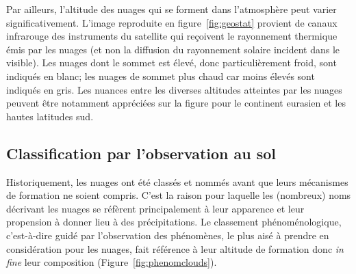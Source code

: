\sk
Par ailleurs, l'altitude des nuages qui se forment dans l'atmosphère peut varier significativement. L'image reproduite en figure~\ref{fig:geostat} provient de canaux infrarouge des instruments du satellite qui reçoivent le rayonnement thermique émis par les nuages (et non la diffusion du rayonnement solaire incident dans le visible). Les nuages dont le sommet est élevé, donc particulièrement froid, sont indiqués en blanc; les nuages de sommet plus chaud car moins élevés sont indiqués en gris. Les nuances entre les diverses altitudes atteintes par les nuages peuvent être notamment appréciées sur la figure pour le continent eurasien et les hautes latitudes sud.

\sk
\subsection{Classification par l'observation au sol}

\sk
Historiquement, les nuages ont été classés et nommés avant que leurs mécanismes de formation ne soient compris. C'est la raison pour laquelle les (nombreux) noms décrivant les nuages se réfèrent principalement à leur apparence et leur propension à donner lieu à des précipitations. Le classement phénoménologique, c'est-à-dire guidé par l'observation des phénomènes, le plus aisé à prendre en considération pour les nuages, fait référence à leur altitude de formation donc \emph{in fine} leur composition (Figure~\ref{fig:phenomclouds}).


